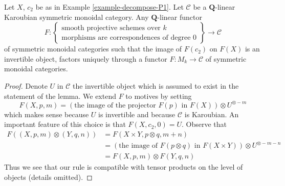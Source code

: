 \begin{lemma}
\label{lemma-characterize-motives}
Let $X$, $c_2$ be as in Example \ref{example-decompose-P1}.
Let $\mathcal{C}$ be a $\mathbf{Q}$-linear Karoubian symmetric
monoidal category. Any $\mathbf{Q}$-linear functor
$$
F :
\left\{
\begin{matrix}
\text{smooth projective schemes over }k\\
\text{morphisms are correspondences of degree }0
\end{matrix}
\right\}
\longrightarrow
\mathcal{C}
$$
of symmetric monoidal categories such that the image of $F(c_2)$ on
$F(X)$ is an invertible object, factors uniquely through a functor
$F : M_k \to \mathcal{C}$ of symmetric monoidal categories.
\end{lemma}

\begin{proof}
Denote $U$ in $\mathcal{C}$ the invertible object which is assumed to exist
in the statement of the lemma. We extend $F$ to motives by setting
$$
F(X, p, m) = \left(\text{the image of
the projector }F(p)\text{ in }F(X)\right) \otimes U^{\otimes -m}
$$
which makes sense because $U$ is invertible and because $\mathcal{C}$
is Karoubian. An important feature of this choice is that
$F(X, c_2, 0) = U$. Observe that
\begin{align*}
F((X, p, m) \otimes (Y, q, n))
& =
F(X \times Y, p \otimes q, m + n) \\
& =
\left(\text{the image of }F(p \otimes q)\text{ in }F(X \times Y)\right)
\otimes U^{\otimes -m - n} \\
& =
F(X, p, m) \otimes F(Y, q, n)
\end{align*}
Thus we see that our rule is compatible with tensor products on
the level of objects (details omitted).


\end{proof}
